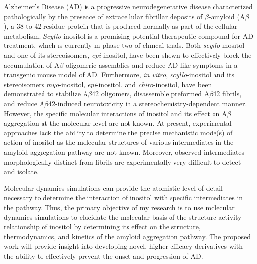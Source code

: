
Alzheimer's Disease (AD) is a progressive neurodegenerative disease characterized pathologically by the presence of extracellular fibrillar deposits of $\beta$-amyloid (A$\beta$), a 38 to 42 residue protein that is produced normally as part of the cellular metabolism. \emph{Scyllo}-inositol is a promising potential therapeutic compound for AD treatment, which is currently in phase two of clinical trials. Both \emph{scyllo}-inositol and one of its stereoisomers, \emph{epi}-inositol, have been shown to effectively block the accumulation of A$\beta$ oligomeric assemblies and reduce AD-like symptoms in a transgenic mouse model of AD. Furthermore, \emph{in vitro}, \emph{scyllo}-inositol and its stereoisomers \emph{myo}-inositol, \emph{epi}-inositol, and \emph{chiro}-inositol, have been demonstrated to stabilize A$\beta$42 oligomers, disassemble preformed A$\beta$42 fibrils, and reduce A$\beta$42-induced neurotoxicity in a stereochemistry-dependent manner. However, the specific molecular interactions of inositol and its effect on A$\beta$ aggregation at the molecular level are not known. At present, experimental approaches lack the ability to determine the precise mechanistic mode(s) of action of inositol as the molecular structures of various intermediates in the amyloid aggregation pathway are not known. Moreover, observed intermediates morphologically distinct from fibrils are experimentally very difficult to detect and isolate.
 
Molecular dynamics simulations can provide the atomistic level of detail necessary to determine the interaction of inositol with specific intermediates in the pathway. Thus, the primary objective of my research is to use molecular dynamics simulations to elucidate the molecular basis of the structure-activity relationship of inositol by determining its effect on the structure, thermodynamics, and kinetics of the amyloid aggregation pathway. The proposed work will provide insight into developing novel, higher-efficacy derivatives with the ability to effectively prevent the onset and progression of AD.